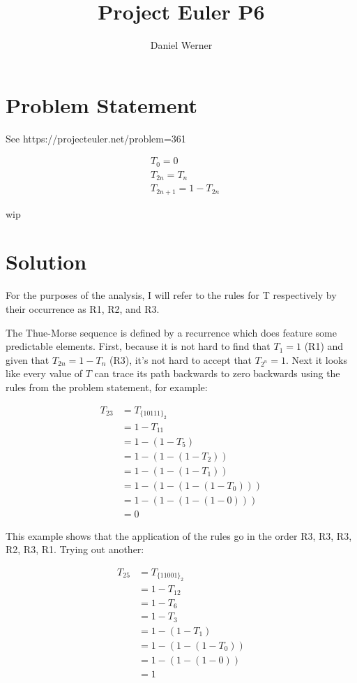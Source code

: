 \documentclass{article}
\title{Project Euler P6}
\author{Daniel Werner}
\begin{document}
\maketitle

\section*{Problem Statement}

See https://projecteuler.net/problem=361

\begin{align*}
    &T_0 = 0 \\
    &T_{2n} = T_n \\
    &T_{2n + 1} = 1 - T_{2n}
\end{align*}

wip

\section*{Solution}

For the purposes of the analysis, I will refer to the rules for T respectively by their occurrence as R1, R2, and R3.

\par

The Thue-Morse sequence is defined by a recurrence which does feature some predictable elements.  First, because it is not hard to find that $T_1 = 1$ (R1) and given that $T_{2n} = 1 - T_n$ (R3), it's not hard to accept that $T_{2^n} = 1$.  Next it looks like every value of $T$ can trace its path backwards to zero backwards using the rules from the problem statement, for example:

\begin{align*}
    T_{23} &= T_{\{10111\}_2} \\
    &= 1 - T_{11} \\ 
    &= 1 - (1 - T_5) \\
    &= 1 - (1 - (1 - T_2)) \\
    &= 1 - (1 - (1 - T_1)) \\
    &= 1 - (1 - (1 - (1 - T_0))) \\
    &= 1 - (1 - (1 - (1 - 0))) \\
    &= 0
\end{align*}

This example shows that the application of the rules go in the order R3, R3, R3, R2, R3, R1. Trying out another:

\begin{align*}
    T_{25} &= T_{\{11001\}_2} \\
    &= 1 - T_{12} \\ 
    &= 1 - T_6 \\
    &= 1 - T_3 \\
    &= 1 - (1 - T_1) \\
    &= 1 - (1 - (1 - T_0)) \\
    &= 1 - (1 - (1 - 0)) \\
    &= 1
\end{align*}
\end{document}
